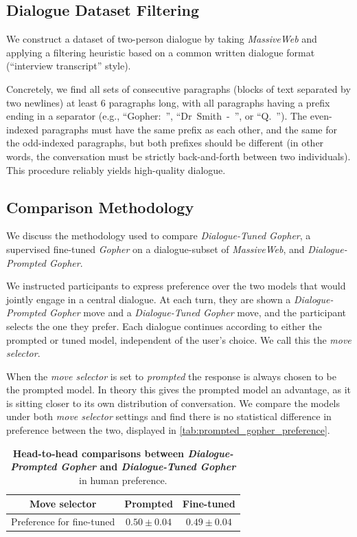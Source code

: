 \documentclass[11pt, a4paper, logo, internal, copyright, nonumbering]{deepmind}
\newcommand{\massiveweb}{\textit{MassiveWeb}\xspace}
\newcommand{\gopher}{\textit{Gopher}\xspace}
\newcommand{\gopherchat}{\textit{Dialogue-Prompted Gopher}\xspace}
\newcommand{\gopherchatsl}{\textit{Dialogue-Tuned Gopher}\xspace}
\begin{document}
\subsection{Dialogue Dataset Filtering}
\label{app:dialogue_data}
We construct a dataset of two-person dialogue by taking \massiveweb and applying a filtering heuristic based on a common written dialogue format (``interview transcript'' style). 

Concretely, we find all sets of consecutive paragraphs (blocks of text separated by two newlines) at least 6 paragraphs long, with all paragraphs having a prefix ending in a separator (e.g., \mbox{``Gopher: ''}, \mbox{``Dr Smith - ''}, or \mbox{``Q. ''}). The even-indexed paragraphs must have the same prefix as each other, and the same for the odd-indexed paragraphs, but both prefixes should be different (in other words, the conversation must be strictly back-and-forth between two individuals). This procedure reliably yields high-quality dialogue.


\subsection{Comparison Methodology}
\label{app:gopherchat_methodology}
We discuss the methodology used to compare \gopherchatsl, a supervised fine-tuned \gopher on a dialogue-subset of \massiveweb, and \gopherchat.

We instructed participants to express preference over the two models that would jointly engage in a central dialogue. At each turn, they are shown a \gopherchat move and a \gopherchatsl move, and the participant selects the one they prefer. Each dialogue continues according to either the prompted or tuned model, independent of the user's choice. We call this the \textit{move selector}.

When the \textit{move selector} is set to \textit{prompted} the response is always chosen to be the prompted model. In theory this gives the prompted model an advantage, as it is sitting closer to its own distribution of conversation. We compare the models under both \textit{move selector} settings and find there is no statistical difference in preference between the two, displayed in \autoref{tab:prompted_gopher_preference}.

\begin{table}[H]
\centering
\begin{tabular}{c|c|c}
\textbf{Move selector} & Prompted  & Fine-tuned \\
\midrule
Preference for fine-tuned & $0.50 \pm 0.04$ & $0.49 \pm 0.04$ \\

\end{tabular}
\caption{\textbf{Head-to-head comparisons between \gopherchat and \gopherchatsl} in human preference.}
\label{tab:prompted_gopher_preference}
\end{table}
\end{document}
